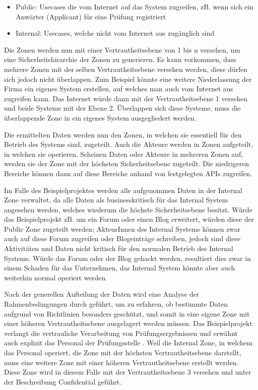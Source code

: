 \begin{itemize}
  \item Public: Usecases die vom Internet auf das System zugreifen, zB. wenn sich ein Anwärter (Applicant) für eine Prüfung registriert
  \item Internal: Usecases, welche nicht vom Internet aus zugänglich sind
\end{itemize}

Die Zonen werden nun mit einer Vertrautheitsebene von 1 bis n versehen, um eine Sicherheitshirarchie der Zonen zu generieren. Es kann vorkommen, dass mehrere Zonen mit der selben Vertrautheitsebene versehen werden, diese dürfen sich jedoch nicht überlappen. Zum Beispiel könnte eine weitere Niederlassung der Firma ein eigenes System erstellen, auf welches man auch vom Internet aus zugreifen kann. Das Internet würde dann mit der Vertrautheitsebene 1 versehen und beide Systeme mit der Ebene 2. Überlappen sich diese Systeme, muss die überlappende Zone in ein eigenes System ausgegliedert werden.

Die ermittelten Daten werden nun den Zonen, in welchen sie essentiell für den Betrieb des Systems sind, zugeteilt. Auch die Akteure werden in Zonen aufgeteilt, in welchen sie operieren. Scheinen Daten oder Akteure in mehreren Zonen auf, werden sie der Zone mit der höchsten Sicherheitsebene zugeteilt. Die niedrigeren Bereiche können dann auf diese Bereiche anhand von festgelegten APIs zugreifen.

Im Falle des Beispielprojektes werden alle aufgenommen Daten in der Internal Zone verwaltet, da alle Daten als businesskritisch für das Internal System angesehen werden, welches wiederum die höchste Sicherheitsebene besitzt. Würde das Beispielprojekt zB. um ein Forum oder einen Blog erweitert, würden diese der Public Zone zugeteilt werden; AkteurInnen des Internal Systems können zwar auch auf diese Forum zugreifen oder Blogeinträge schreiben, jedoch sind diese Aktivitäten und Daten nicht kritisch für den normalen Betrieb des Internal Systems. Würde das Forum oder der Blog gehackt werden, resultiert dies zwar in einem Schaden für das Unternehmen, das Internal System könnte aber auch weiterhin normal operiert werden.

Nach der generellen Aufteilung der Daten wird eine Analyse der Rahmenbedingungen durch geführt, um zu erfahren, ob bestimmte Daten aufgrund von Richtlinien besonders geschützt, und somit in eine eigene Zone mit einer höheren Vertrautheitsebene ausgelagert werden müssen. Das Beispielprojekt verlangt die vertrauliche Verarbeitung von Prüfungsergebnissen und erwähnt auch explizit das Personal der Prüfungsstelle \cite[7.3]{ISO_CERT}. Weil die Internal Zone, in welchem das Personal operiert, die Zone mit der höchsten Vertrautheitsebene darstellt, muss eine weitere Zone mit einer höheren Vertrautheitsebene erstellt werden. Diese Zone wird in diesem Falle mit der Vertrautheitsebene 3 versehen und unter der Beschreibung Confidential geführt.

